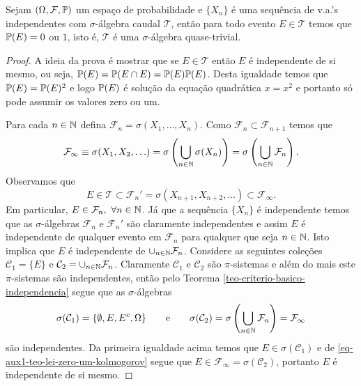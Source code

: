 \begin{teorema}
\label{teo-lei-zero-um-kolmogorov}
Sejam $(\Omega,\F,\P)$ um espaço de probabilidade
e $\{X_n\}$ é uma sequência de v.a.'s independentes
com $\sigma$-álgebra caudal $\mathcal{T}$, então 
para todo evento $E\in\mathcal{T}$ temos que 
$\P(E)=0$ ou $1$, isto é, $\mathcal{T}$ 
é uma $\sigma$-álgebra quase-trivial.
\end{teorema}


\begin{proof}
A ideia da prova é mostrar que se $E\in\mathcal{T}$
então $E$ é independente de si mesmo, ou seja,
$\P(E)=\P(E\cap E)=\P(E)\P(E)$. Desta igualdade 
temos que $\P(E)=\P(E)^2$ e logo $\P(E)$ é solução 
da equação quadrática $x=x^2$ e portanto só pode 
assumir os valores zero ou um.   


Para cada $n\in\N$ defina $\mathcal{F}_n=\sigma(X_1,\ldots,X_n)$.
Como $\mathcal{F}_n\subset \mathcal{F}_{n+1}$ temos que  
\[
	\mathcal{F}_{\infty}
	\equiv
	\sigma(X_1,X_2,\ldots)
	=
	\sigma\left( \bigcup_{n\in\N} \sigma(X_n) \right)
	=
	\sigma\left( \bigcup_{n\in\N} \mathcal{F}_n \right).
\]
Observamos que
\begin{equation}\label{eq-aux1-teo-lei-zero-um-kolmogorov}
	E\in \mathcal{T}\subset \mathcal{F}_n'
	=
	\sigma(X_{n+1},X_{n+2},\ldots)
	\subset 
	\mathcal{F}_{\infty}.
\end{equation}
Em particular, $E\in \mathcal{F}_n,\ \forall n\in\N$.
Já que a sequência $\{X_n\}$ é independente temos que
as $\sigma$-álgebras $\mathcal{F}_n$ e $\mathcal{F}_n'$
são claramente independentes e assim $E$ é independente
de qualquer evento em $\mathcal{F}_n$ para qualquer 
que seja $n\in\N$. Isto implica que $E$ é independente
de $\cup_{n\in\N} \mathcal{F}_n$.
Considere as seguintes coleções $\mathcal{C}_1=\{E\}$ 
e $\mathcal{C}_2=\cup_{n\in\N} \mathcal{F}_n$. Claramente
$\mathcal{C}_1$ e $\mathcal{C}_2$ são $\pi$-sistemas e 
além do mais este $\pi$-sistemas são independentes,
então pelo Teorema \ref{teo-criterio-basico-independencia}
segue que as $\sigma$-álgebras
	\[
	\sigma(\mathcal{C}_1)=\{\emptyset,E,E^c,\Omega\}
	\qquad
	\text{e}
	\qquad
	\sigma(\mathcal{C}_2)
		=\sigma\left( \bigcup_{n\in\N} \mathcal{F}_n \right)
		=\mathcal{F}_{\infty}
	\]
são independentes. Da primeira 
igualdade acima temos que 
$E\in \sigma(\mathcal{C}_1)$ e de 
\eqref{eq-aux1-teo-lei-zero-um-kolmogorov} 
segue que 
$E\in \mathcal{F}_{\infty}=\sigma(\mathcal{C}_2)$, 
portanto $E$ é independente de si mesmo.
\end{proof}













